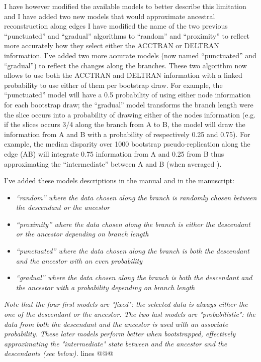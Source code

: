 \documentclass[12pt,letterpaper]{article}
\begin{document}
\begin{enumerate}
I have however modified the available models to better describe this limitation and I have added two new models that would approximate ancestral reconstruction along edges
I have modified the name of the two previous ``punctuated'' and ``gradual'' algorithms to ``random'' and ``proximity'' to reflect more accurately how they select either the ACCTRAN or DELTRAN information.
I've added two more accurate models (now named ``punctuated'' and ``gradual'') to reflect the changes along the branches.
These two algorithm now allows to use both the ACCTRAN and DELTRAN information with a linked probability to use either of them per bootstrap draw.
For example, the ``punctuated'' model will have a 0.5 probability of using either node information for each bootstrap draw; the ``gradual'' model transforms the branch length were the slice occurs into a probability of drawing either of the nodes information (e.g. if the slices occurs 3/4 along the branch from A to B, the model will draw the information from A and B with a probability of respectively 0.25 and 0.75).
For example, the median disparity over 1000 bootstrap pseudo-replication along the edge (AB) will integrate 0.75 information from A and 0.25 from B thus approximating the ``intermediate'' between A and B (when averaged ).

I've added these models descriptions in the manual and in the manuscript:

\begin{itemize}
    \item \textit{``random'' where the data chosen along the branch is randomly chosen between the descendant or the ancestor}
    \item \textit{``proximity'' where the data chosen along the branch is either the descendant or the ancestor depending on branch length}
    \item \textit{``punctuated'' where the data chosen along the branch is both the descendant and the ancestor with an even probability}
    \item \textit{``gradual'' where the data chosen along the branch is both the descendant and the ancestor with a probability depending on branch length}
\end{itemize}

\textit{Note that the four first models are "fixed": the selected data is always either the one of the descendant or the ancestor.
The two last models are "probabilistic": the data from both the descendant and the ancestor is used with an associate probability.
These later models perform better when bootstrapped, effectively approximating the "intermediate" state between and the ancestor and the descendants (see below).} lines @@@


\end{enumerate}
\end{document}
